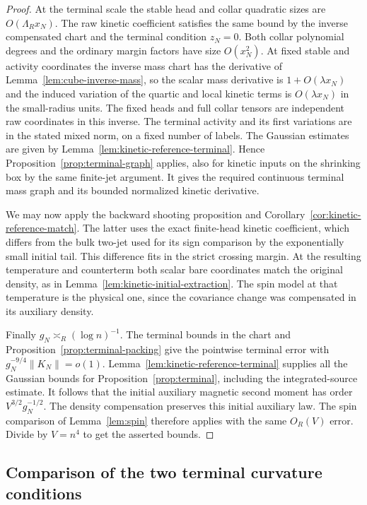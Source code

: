 \documentclass[11pt]{article}
\theoremstyle{definition}
\begin{document}
\begin{proof}
At the terminal scale the stable head and collar
quadratic sizes are \(O(\Lambda_R x_N)\).
The raw kinetic coefficient satisfies the same bound by
the inverse compensated chart and the terminal condition
\(z_N=0\). Both collar polynomial degrees and the ordinary
margin factors have size \(O(x_N^2)\).
At fixed stable and activity coordinates the inverse mass
chart has the derivative of Lemma~\ref{lem:cube-inverse-mass}, so
the scalar mass derivative is \(1+O(\lambda x_N)\) and
the induced variation of the quartic and local kinetic
terms is \(O(\lambda x_N)\) in the small-radius units.
The fixed heads and full collar tensors are independent
raw coordinates in this inverse. The terminal activity
and its first variations are in the stated mixed norm,
on a fixed number of labels. The Gaussian estimates are
given by Lemma~\ref{lem:kinetic-reference-terminal}.
Hence Proposition~\ref{prop:terminal-graph} applies,
also for kinetic inputs on the shrinking box by the same
finite-jet argument. It gives the required continuous
terminal mass graph and its bounded normalized kinetic
derivative.

We may now apply the backward shooting proposition and
Corollary~\ref{cor:kinetic-reference-match}. The latter
uses the exact finite-head kinetic coefficient, which
differs from the bulk two-jet used for its sign comparison
by the exponentially small initial tail. This difference
fits in the strict crossing margin. At the resulting
temperature and counterterm both scalar bare coordinates
match the original density, as in
Lemma~\ref{lem:kinetic-initial-extraction}. The
spin model at that temperature is the physical one,
since the covariance change was compensated in its
auxiliary density.

Finally \(g_N\asymp_R(\log n)^{-1}\).
The terminal bounds in the chart and
Proposition~\ref{prop:terminal-packing} give the pointwise
terminal error with
\(g_N^{-9/4}\|K_N\|=o(1)\).
Lemma~\ref{lem:kinetic-reference-terminal} supplies all
the Gaussian bounds for Proposition~\ref{prop:terminal},
including the integrated-source estimate. It follows
that the initial auxiliary magnetic second moment has
order \(V^{3/2}g_N^{-1/2}\). The density compensation
preserves this initial auxiliary law. The spin comparison
of Lemma~\ref{lem:spin} therefore applies with the same
\(O_R(V)\) error. Divide by \(V=n^4\) to get the asserted
bounds.
\end{proof}

\subsection{Comparison of the two terminal curvature conditions}
\label{sec:kinetic-curvature-comparison}
\end{document}
